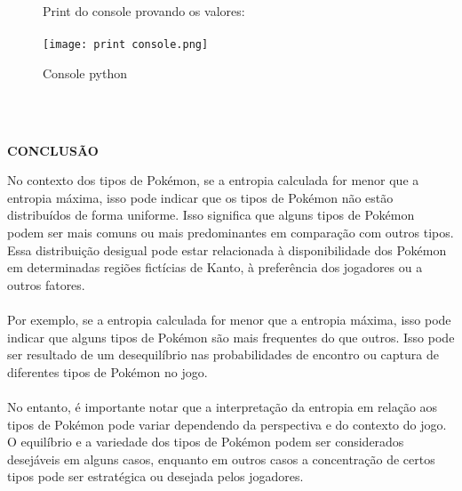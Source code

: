 \documentclass[a4paper,12pt]{article}
\begin{document}
\pagebreak
\begin{figure}
Print do console provando os valores:\\\\
    \centering
    \texttt{[image: print console.png]}
    \caption{Console python}
    \label{fig:enter-label}
\end{figure}
\pagebreak
\\\\
\begin{center}
\textbf{CONCLUSÃO}    
\end{center}

No contexto dos tipos de Pokémon, se a entropia calculada for menor que a entropia máxima, isso pode indicar que os tipos de Pokémon não estão distribuídos de forma uniforme. Isso significa que alguns tipos de Pokémon podem ser mais comuns ou mais predominantes em comparação com outros tipos. Essa distribuição desigual pode estar relacionada à disponibilidade dos Pokémon em determinadas regiões fictícias de Kanto, à preferência dos jogadores ou a outros fatores.
\\\\
Por exemplo, se a entropia calculada for menor que a entropia máxima, isso pode indicar que alguns tipos de Pokémon são mais frequentes do que outros. Isso pode ser resultado de um desequilíbrio nas probabilidades de encontro ou captura de diferentes tipos de Pokémon no jogo.
\\\\
No entanto, é importante notar que a interpretação da entropia em relação aos tipos de Pokémon pode variar dependendo da perspectiva e do contexto do jogo. O equilíbrio e a variedade dos tipos de Pokémon podem ser considerados desejáveis em alguns casos, enquanto em outros casos a concentração de certos tipos pode ser estratégica ou desejada pelos jogadores.
\end{document}
